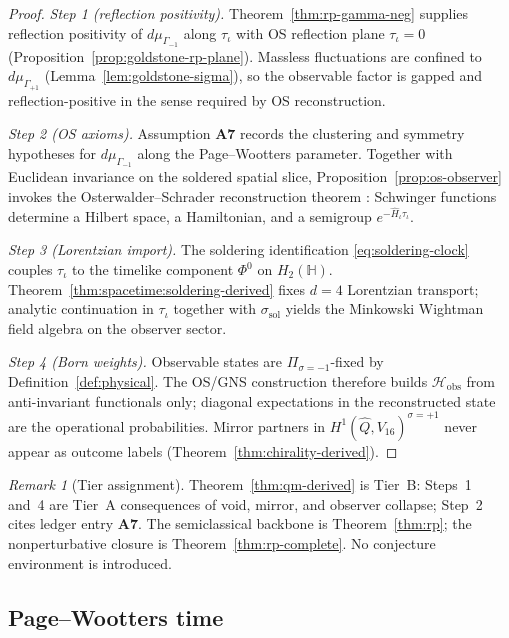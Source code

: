 \documentclass[aps,prd,onecolumn,amsmath,amssymb,nofootinbib,11pt]{revtex4-2}
\numberwithin{equation}{section}
\theoremstyle{plain}
\theoremstyle{definition}
\theoremstyle{remark}
\newtheorem{remark}[theorem]{Remark}
\newcommand{\Quat}{\mathbb{H}}
\newcommand{\orderparam}{\Phi}
\begin{document}
\begin{proof}
\emph{Step 1 (reflection positivity).}
Theorem~\ref{thm:rp-gamma-neg} supplies reflection positivity of
$d\mu_{\Gamma_{-1}}$ along $\tau_\iota$ with OS reflection plane
$\tau_\iota=0$ (Proposition~\ref{prop:goldstone-rp-plane}). Massless
fluctuations are confined to $d\mu_{\Gamma_{+1}}$
(Lemma~\ref{lem:goldstone-sigma}), so the observable factor is gapped and
reflection-positive in the sense required by OS reconstruction.

\emph{Step 2 (OS axioms).}
Assumption \textbf{A7} records the clustering and symmetry hypotheses for
$d\mu_{\Gamma_{-1}}$ along the Page--Wootters parameter. Together with
Euclidean invariance on the soldered spatial slice, Proposition~\ref{prop:os-observer}
invokes the Osterwalder--Schrader reconstruction theorem
\cite{OsterwalderSchrader1973}: Schwinger functions determine a Hilbert space,
a Hamiltonian, and a semigroup $e^{-\hat H_\iota\tau_\iota}$.

\emph{Step 3 (Lorentzian import).}
The soldering identification \eqref{eq:soldering-clock} couples
$\tau_\iota$ to the timelike component $\orderparam^0$ on $H_2(\Quat)$.
Theorem~\ref{thm:spacetime:soldering-derived} fixes $d=4$ Lorentzian transport;
analytic continuation in $\tau_\iota$ together with $\sigma_{\mathrm{sol}}$
yields the Minkowski Wightman field algebra on the observer sector.

\emph{Step 4 (Born weights).}
Observable states are $\Pi_{\sigma=-1}$-fixed by Definition~\ref{def:physical}.
The OS/GNS construction therefore builds $\mathcal{H}_{\mathrm{obs}}$ from
anti-invariant functionals only; diagonal expectations in the reconstructed
state are the operational probabilities. Mirror partners in
$H^1(\hat Q,V_{16})^{\sigma=+1}$ never appear as outcome labels
(Theorem~\ref{thm:chirality-derived}).
\end{proof}

\begin{remark}[Tier assignment]
Theorem~\ref{thm:qm-derived} is Tier~B: Steps~1 and~4 are Tier~A consequences
of void, mirror, and observer collapse; Step~2 cites ledger entry \textbf{A7}.
The semiclassical backbone is Theorem~\ref{thm:rp}; the nonperturbative closure
is Theorem~\ref{thm:rp-complete}. No conjecture environment is introduced.
\end{remark}

\subsection{Page--Wootters time}
\end{document}
